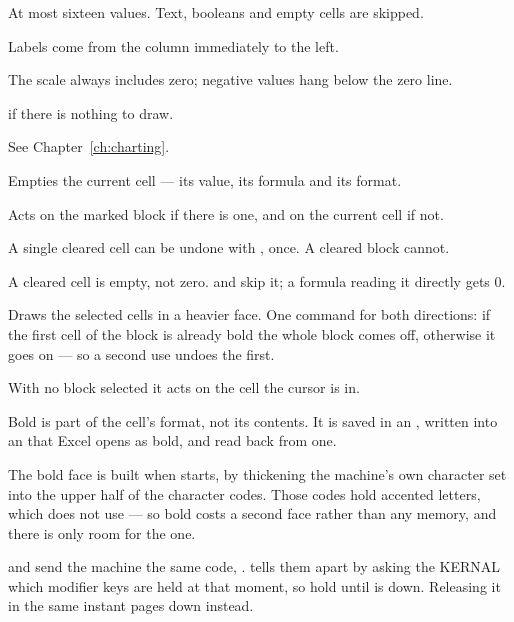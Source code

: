 \begin{ccsteps}
\item At most sixteen values. Text, booleans and empty cells are skipped.
\item Labels come from the column immediately to the left.
\item The scale always includes zero; negative values hang below the zero line.
\item {} if there is nothing to draw.
\item See Chapter~\ref{ch:charting}.
\end{ccsteps}


Empties the current cell --- its value, its formula and its format.

\begin{ccsteps}
\item Acts on the marked block if there is one, and on the current cell if not.
\item A single cleared cell can be undone with , once. A cleared block
cannot.
\item A cleared cell is empty, not zero.  and  skip it; a
formula reading it directly gets 0.
\end{ccsteps}


Draws the selected cells in a heavier face. One command for both directions:
if the first cell of the block is already bold the whole block comes off,
otherwise it goes on --- so a second use undoes the first.

With no block selected it acts on the cell the cursor is in.

Bold is part of the cell's format, not its contents. It is saved in an
, written into an  that Excel opens as bold, and
read back from one.

\begin{ccnote}
The bold face is built when \ccprod{} starts, by thickening the machine's own
character set into the upper half of the character codes. Those codes hold
accented letters, which \ccprod{} does not use --- so bold costs a second
face rather than any memory, and there is only room for the one.
\end{ccnote}

\begin{cccaution}
 and  send the machine the same code, .
\ccprod{} tells them apart by asking the KERNAL which modifier keys are held
at that moment, so hold  until  is down. Releasing it in the
same instant pages down instead.
\end{cccaution}

